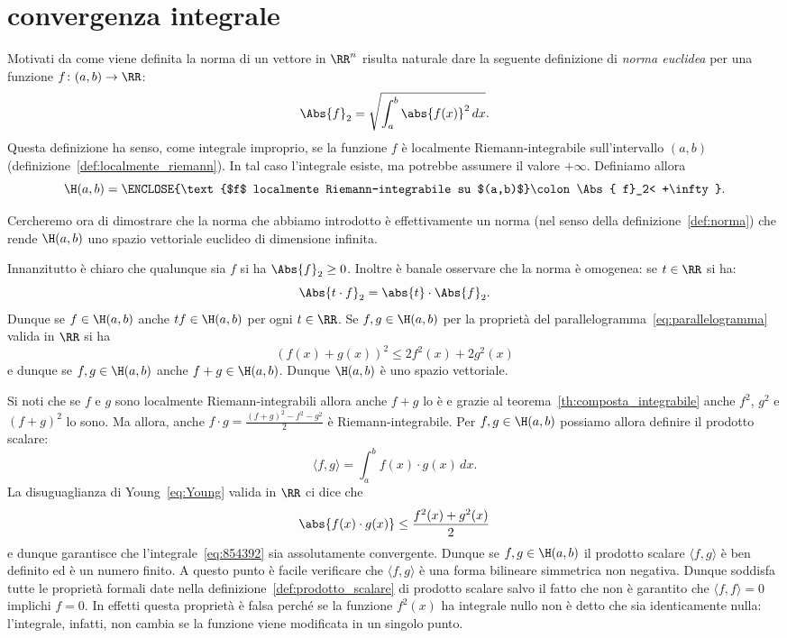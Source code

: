 \section{convergenza integrale}
\label{sec:convergenza_integrale}

Motivati da come viene definita la norma di un vettore
in $\RR^n$ risulta naturale
dare la seguente definizione di
\emph{norma euclidea} per una funzione $f\colon (a,b)\to \RR$:
\[
  \Abs{f}_2 = \sqrt{\int_a^b \abs{f(x)}^2\, dx}.
\]
Questa definizione ha senso, come integrale improprio, se la funzione $f$
è localmente Riemann-integrabile sull'intervallo $(a,b)$
(definizione~\ref{def:localmente_riemann}).
In tal
caso l'integrale esiste, ma potrebbe assumere il valore $+\infty$. Definiamo
allora
\[
\H(a,b) =
\ENCLOSE{\text{$f$ localmente Riemann-integrabile su $(a,b)$}\colon \Abs{ f}_2< +\infty}.
\]

Cercheremo ora di dimostrare che la norma che abbiamo introdotto
è effettivamente un norma (nel senso della definizione~\ref{def:norma})
che rende $\H(a,b)$ uno spazio vettoriale euclideo di dimensione infinita.

Innanzitutto è chiaro che qualunque sia $f$ si ha
$\Abs{ f}_2\ge 0$.
Inoltre è banale osservare che la norma è omogenea: se $t\in \RR$ si ha:
\[
  \Abs{t\cdot f}_2= \abs{t}\cdot \Abs{f}_2.
\]
Dunque se $f\in \H(a,b)$ anche $t f\in \H(a,b)$ per ogni $t \in \RR$.
Se $f,g\in \H(a,b)$ per la proprietà del parallelogramma~\eqref{eq:parallelogramma}
valida in $\RR$ si ha
\[
  (f(x) + g(x))^2 \le 2f^2(x) + 2 g^2(x)
\]
e dunque se $f,g \in \H(a,b)$ anche $f+g\in \H(a,b)$.
Dunque $\H(a,b)$ è uno spazio vettoriale.

Si noti che se $f$ e $g$ sono localmente Riemann-integrabili 
allora anche $f+g$ lo è 
e grazie al teorema~\ref{th:composta_integrabile} anche 
$f^2$, $g^2$ e $(f+g)^2$ lo sono.
Ma allora, anche $f\cdot g = \frac{(f+g)^2-f^2-g^2}{2}$ 
è Riemann-integrabile.
Per $f,g\in \H(a,b)$ possiamo allora definire il prodotto scalare:
\begin{equation}\label{eq:854392}
  \langle f, g\rangle = \int_a^b f(x) \cdot g(x)\, dx.
\end{equation}
La disuguaglianza di
Young~\eqref{eq:Young} valida in $\RR$ ci dice che
\[
  \abs{f(x) \cdot g(x)} \le \frac{f^2(x)+g^2(x)}{2}
\]
e dunque garantisce che l'integrale~\eqref{eq:854392}
sia assolutamente convergente. Dunque se $f,g\in \H(a,b)$
il prodotto scalare $\langle f,g\rangle$ è ben definito ed
è un numero finito. A questo punto è facile verificare
che $\langle f,g\rangle$ è una forma bilineare simmetrica
non negativa. Dunque soddisfa tutte le proprietà formali
date nella definizione~\ref{def:prodotto_scalare} di prodotto scalare
salvo il fatto che non è garantito che $\langle f,f\rangle = 0$
implichi $f=0$. In effetti questa proprietà è falsa perché
se la funzione $f^2(x)$ ha integrale nullo non è detto che sia
identicamente nulla: l'integrale, infatti, non cambia
se la funzione viene modificata in un singolo punto.

